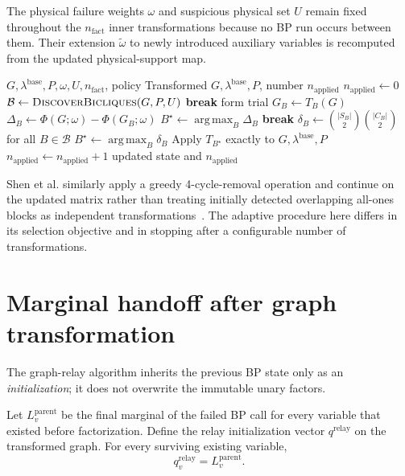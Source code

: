 \documentclass[11pt,a4paper]{article}
\newcommand{\Bcal}{\mathcal B}
\newcommand{\argmax}{\operatorname*{arg\,max}}
\begin{document}
The physical failure weights $\omega$ and suspicious physical set $U$ remain
fixed throughout the $n_{\mathrm{fact}}$ inner transformations because no BP
run occurs between them. Their extension $\widetilde\omega$ to newly introduced
auxiliary variables is recomputed from the updated physical-support map.

\begin{algorithm}[H]
\caption{\textsc{FactorizeGraph}}
\begin{algorithmic}[1]
\Require $G,\lambda^{\mathrm{base}},P,\omega,U,n_{\mathrm{fact}}$, policy
\Ensure Transformed $G,\lambda^{\mathrm{base}},P$, number $n_{\mathrm{applied}}$
\State $n_{\mathrm{applied}}\gets0$
    \State $\Bcal\gets\textsc{DiscoverBicliques}(G,P,U)$
    \If{$\Bcal=\varnothing$}
        \State \textbf{break}
    \EndIf
        \ForAll{$B\in\Bcal$}
            \State form trial $G_B\gets T_B(G)$
            \State $\Delta_B\gets\Phi(G;\omega)-\Phi(G_B;\omega)$
        \EndFor
        \State $B^\star\gets\argmax_B\Delta_B$
            \State \textbf{break}
        \EndIf
    \Else
        \State $\delta_B\gets\binom{|S_B|}{2}\binom{|C_B|}{2}$ for all $B\in\Bcal$
        \State $B^\star\gets\argmax_B\delta_B$
    \EndIf
    \State Apply $T_{B^\star}$ exactly to $G,\lambda^{\mathrm{base}},P$
    \State $n_{\mathrm{applied}}\gets n_{\mathrm{applied}}+1$
\EndFor
\State \Return updated state and $n_{\mathrm{applied}}$
\end{algorithmic}
\end{algorithm}

Shen et al. similarly apply a greedy 4-cycle-removal operation and continue on
the updated matrix rather than treating initially detected overlapping
all-ones blocks as independent transformations~\cite{shen}. The adaptive
procedure here differs in its selection objective and in stopping after a
configurable number of transformations.

\section{Marginal handoff after graph transformation}
\label{sec:handoff}

The graph-relay algorithm inherits the previous BP state only as an
\emph{initialization}; it does not overwrite the immutable unary factors.

Let $L_v^{\mathrm{parent}}$ be the final marginal of the failed BP call for
every variable that existed before factorization. Define the relay
initialization vector $q^{\mathrm{relay}}$ on the transformed graph. For every
surviving existing variable,
\[
q_v^{\mathrm{relay}}
=
L_v^{\mathrm{parent}}.
\]
\end{document}
